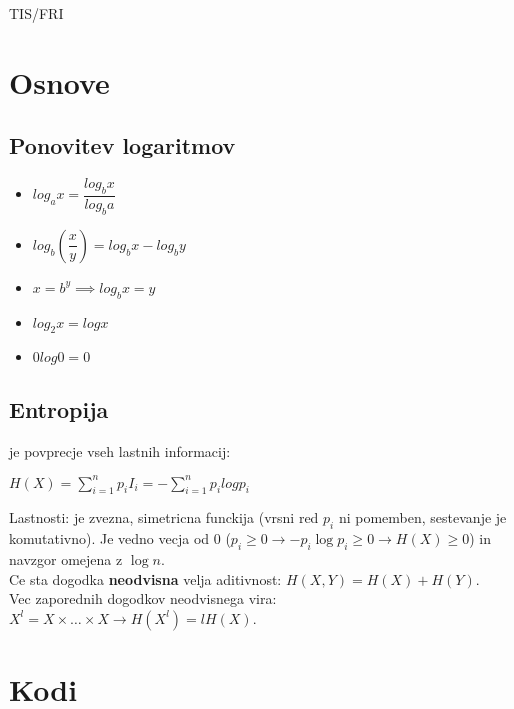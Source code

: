 \documentclass{article}
\begin{document}
\begin{center}
    {\small TIS/FRI \par}
\end{center}

\begin{multicols}{3}

\section{Osnove}

\subsection{Ponovitev logaritmov}
\begin{small}
    \begin{itemize} 
        \item $log_a x = \dfrac{log_b x}{log_b a}$
        \item $log_b(\dfrac{x}{y}) = log_b x - log_b y$
        \item $x = b^y \implies log_b x = y$
        \item $log_2 x = log x$
        \item $0log0 = 0$
    \end{itemize}
\end{small}

\subsection{Entropija}
je povprecje vseh lastnih informacij:
\begin{center}
    \begin{math}
        H(X) = \sum_{i=1}^{n} p_i I_i = -\sum_{i=1}^{n} p_i log p_i
    \end{math}
\end{center}
Lastnosti: je zvezna, simetricna funckija (vrsni red $p_i$ ni pomemben, sestevanje je komutativno). Je vedno vecja
od 0 ($p_i \geq 0 \rightarrow -p_i \log p_i \geq 0 \rightarrow H(X) \geq 0$) in navzgor omejena z $\log n$.\\
Ce sta dogodka \textbf{neodvisna} velja aditivnost: $H(X, Y) = H(X) + H(Y)$.\\
Vec zaporednih dogodkov neodvisnega vira: $X^l = X \times \dots \times X \rightarrow H(X^l) = lH(X)$.

\section{Kodi}


\end{multicols}
\end{document}
